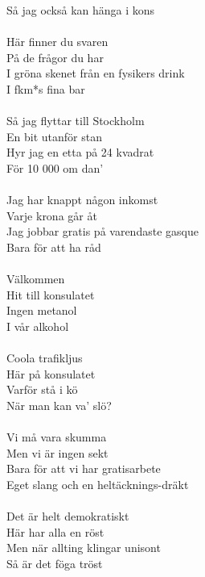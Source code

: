 \documentclass[a6paper, 10pt, twoside]{article}
\begin{document}
\begin{lyrics}
Så jag också kan hänga i kons\\
\vspace{2pt}\\
Här finner du svaren\\
På de frågor du har\\
I gröna skenet från en fysikers drink\\
I fkm*s fina bar\\
\vspace{2pt}\\
Så jag flyttar till Stockholm\\
En bit utanför stan\\
Hyr jag en etta på 24 kvadrat\\
För 10 000 om dan’\\
\vspace{2pt}\\
Jag har knappt någon inkomst\\
Varje krona går åt\\
Jag jobbar gratis på varendaste gasque\\
Bara för att ha råd\\
\vspace{2pt}\\
Välkommen \\
Hit till konsulatet\\
Ingen metanol\\
I vår alkohol\\
\vspace{5pt}\\
Coola trafikljus\\
Här på konsulatet\\
Varför stå i kö\\
När man kan va’ slö?\\
\vspace{2pt}\\
Vi må vara skumma\\
Men vi är ingen sekt\\
Bara för att vi har gratisarbete\\
Eget slang och en heltäcknings-dräkt\\
\vspace{2pt}\\
Det är helt demokratiskt\\
Här har alla en röst\\
Men när allting klingar unisont\\
Så är det föga tröst\\
\vspace{2pt}\\

\end{lyrics}
\end{document}
